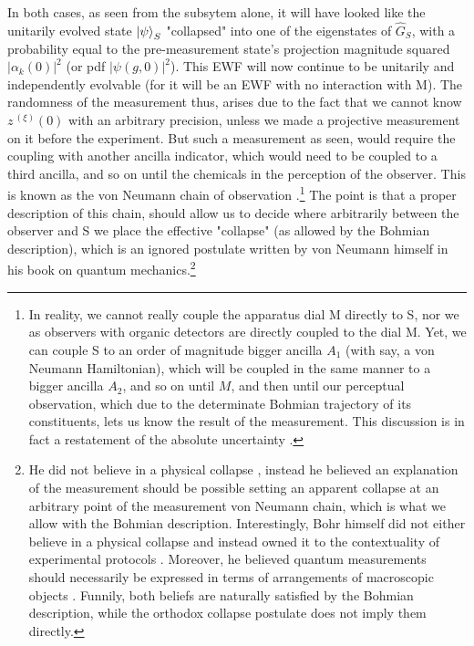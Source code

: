 \documentclass[11pt, a4paper]{article} %
\begin{document}


In both cases, as seen from the subsytem alone, it will have looked like the unitarily evolved state $\ket{\psi}_S$ "collapsed" into one of the eigenstates of $\hat{G}_S$, with a probability equal to the pre-measurement state's projection magnitude squared $|\alpha_k(0)|^2$ (or pdf $|\psi(g,0)|^2$). This EWF will now continue to be unitarily and independently evolvable (for it will be an EWF with no interaction with M). The randomness of the measurement thus, arises due to the fact that we cannot know $z^{\:(\xi)}(0)$ with an arbitrary precision, unless we made a projective measurement on it before the experiment. But such a measurement as seen, would require the coupling with another ancilla indicator, which would need to be coupled to a third ancilla, and so on until the chemicals in the perception of the observer. This is known as the von Neumann chain of observation \cite{vonNeumann}.\footnote{In reality, we cannot really couple the apparatus dial M directly to S, nor we as observers with organic detectors are directly coupled to the dial M. Yet, we can couple S to an order of magnitude bigger ancilla $A_1$ (with say, a von Neumann Hamiltonian), which will be coupled in the same manner to a bigger ancilla $A_2$, and so on until $M$, and then until our perceptual observation, which due to the determinate Bohmian trajectory of its constituents, lets us know the result of the measurement. This discussion is in fact a restatement of the absolute uncertainty \cite{Absolute}.} The point is that a proper description of this chain, should allow us to decide where arbitrarily between the observer and S we place the effective "collapse" (as allowed by the Bohmian description), which is an ignored postulate written by von Neumann himself \cite{NeumannNoCollapse} in his book on quantum mechanics.\footnote{He did not believe in a physical collapse \cite{NeumannNoCollapse}, instead he believed an explanation of the measurement should be possible setting an apparent collapse at an arbitrary point of the measurement von Neumann chain, which is what we allow with the Bohmian description. Interestingly, Bohr himself did not either believe in a physical collapse and instead owned it to the contextuality of experimental protocols \cite{Dirac}. Moreover, he believed quantum measurements should necessarily be expressed in terms of arrangements of macroscopic objects \cite{Bohr}. Funnily, both beliefs are naturally satisfied by the Bohmian description, while the orthodox collapse postulate does not imply them directly.}\vspace{-0.1cm}
\end{document}

